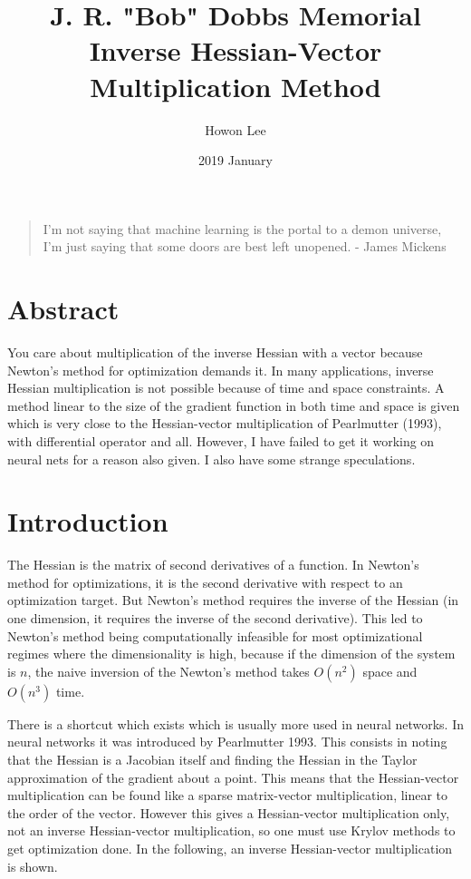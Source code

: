 \documentclass{article}
\begin{document}
\title{J. R. "Bob" Dobbs Memorial Inverse Hessian-Vector Multiplication Method}
\author{Howon Lee}
\date{2019 January}
\maketitle

\begin{quote}
I'm not saying that machine learning is the portal to a demon universe, I'm just saying that some doors are best left unopened. - James Mickens
\end{quote}

\section{Abstract}
You care about multiplication of the inverse Hessian with a vector because Newton's method for optimization demands it. In many applications, inverse Hessian multiplication is not possible because of time and space constraints. A method linear to the size of the gradient function in both time and space is given which is very close to the Hessian-vector multiplication of Pearlmutter (1993), with differential operator and all. However, I have failed to get it working on neural nets for a reason also given. I also have some strange speculations.

\section{Introduction}

The Hessian is the matrix of second derivatives of a function. In Newton's method for optimizations, it is the second derivative with respect to an optimization target. But Newton's method requires the inverse of the Hessian (in one dimension, it requires the inverse of the second derivative). This led to Newton's method being computationally infeasible for most optimizational regimes where the dimensionality is high, because if the dimension of the system is $n$, the naive inversion of the Newton's method takes $O(n^2)$ space and $O(n^3)$ time.

There is a shortcut which exists which is usually more used in neural networks. In neural networks it was introduced by Pearlmutter 1993. This consists in noting that the Hessian is a Jacobian itself and finding the Hessian in the Taylor approximation of the gradient about a point. This means that the Hessian-vector multiplication can be found like a sparse matrix-vector multiplication, linear to the order of the vector. However this gives a Hessian-vector multiplication only, not an inverse Hessian-vector multiplication, so one must use Krylov methods to get optimization done. In the following, an inverse Hessian-vector multiplication is shown.
\end{document}
